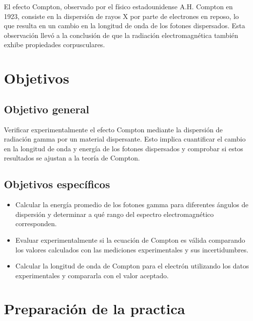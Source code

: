 \documentclass[letterpaper, 12pt]{article}
\begin{document}
El efecto Compton, observado por el físico estadounidense
A.H. Compton en 1923, consiste en la dispersión de rayos X
por parte de electrones en reposo, lo que resulta en un
cambio en la longitud de onda de los fotones dispersados.
Esta observación llevó a la conclusión de que la radiación
electromagnética también exhibe propiedades corpusculares.

\section{Objetivos}

\subsection{Objetivo general}

Verificar experimentalmente el efecto Compton mediante la
dispersión de radiación gamma por un material dispersante.
Esto implica cuantificar el cambio en la longitud de onda y
energía de los fotones dispersados y comprobar si estos
resultados se ajustan a la teoría de Compton.

\subsection{Objetivos específicos}

\begin{itemize}[label=$\triangleright$]
      \item Calcular la energía promedio de los fotones gamma para
            diferentes ángulos de dispersión y determinar a qué rango
            del espectro electromagnético corresponden.

      \item Evaluar experimentalmente si la ecuación de Compton es
            válida comparando los valores calculados con las mediciones
            experimentales y sus incertidumbres.

      \item Calcular la longitud de onda de Compton para el electrón
            utilizando los datos experimentales y compararla con el
            valor aceptado.
\end{itemize}

\section{Preparación de la practica}
\end{document}
